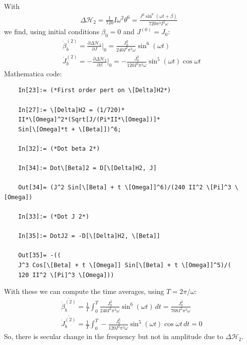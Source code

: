 \documentclass{article}
\theoremstyle{definition}
\newcommand{\p}{\partial}
\newcommand{\ham}{\mathcal{H}}
\newcommand{\be}{\beta}
\newcommand{\f}[2]{\frac{#1}{#2}}
\begin{document}
\begin{enumerate}[label=(\alph*)]
	With 
	\begin{align*}
	\Delta \ham_2 = \f{1}{720} I \omega^2 \theta^6 = \frac{J^3 \sin ^6(\omega t + \be)}{720 \pi ^3 I^2 \omega }
	\end{align*}
	we find, using initial conditions $\be_0 = 0$ and $J^{(0)} = J_0$:
	\begin{align*}
	&\dot\be^{(2)}_b = \f{\p \Delta \ham_2}{\p J}\bigg\vert_0 = 
	\boxed{\f{J_0^2}{240 I^2 \pi^3 \omega} \sin^6 ( \omega t)}\\
	&\dot J^{(2)}_b  = -\f{\p \Delta \ham_2}{\p \be}\bigg\vert_0 = 
	\boxed{- \f{J_0^3 }{120 I^2 \pi^3 \omega} \sin^5( \omega t) \cos \omega t  }
	\end{align*}
	Mathematica code:
	\begin{lstlisting}
	In[23]:= (*First order pert on \[Delta]H2*)
	
	In[27]:= \[Delta]H2 = (1/720)*
	II*\[Omega]^2*(Sqrt[J/(Pi*II*\[Omega])]*
	Sin[\[Omega]*t + \[Beta]])^6;
	
	In[32]:= (*Dot beta 2*)
	
	In[34]:= Dot\[Beta]2 = D[\[Delta]H2, J]
	
	Out[34]= (J^2 Sin[\[Beta] + t \[Omega]]^6)/(240 II^2 \[Pi]^3 \[Omega])
	
	In[33]:= (*Dot J 2*)
	
	In[35]:= DotJ2 = -D[\[Delta]H2, \[Beta]]
	
	Out[35]= -((
	J^3 Cos[\[Beta] + t \[Omega]] Sin[\[Beta] + t \[Omega]]^5)/(
	120 II^2 \[Pi]^3 \[Omega]))
	\end{lstlisting}
	
	
	With these we can compute the time averages, using $T = 2\pi/\omega$:
	\begin{align*}
	&\overline{\dot \be^{(2)}_b} = \f{1}{T}\int^T_0 \f{J_0^2}{240 I^2 \pi^3 \omega} \sin^6 ( \omega t)\,dt = \boxed{\f{J_0^2}{768 I^2 \pi^3 \omega}} \\
	&\overline{\dot J^{(2)}_b} = \f{1}{T} \int^T_0 - \f{J_0^3 }{120 I^2 \pi^3 \omega} \sin^5( \omega t) \cos \omega t\,dt = \boxed{0}
	\end{align*}
	So, there is secular change in the frequency but not in amplitude due to $\Delta \ham_2$. 
	
	
	

\end{enumerate}
\end{document}
